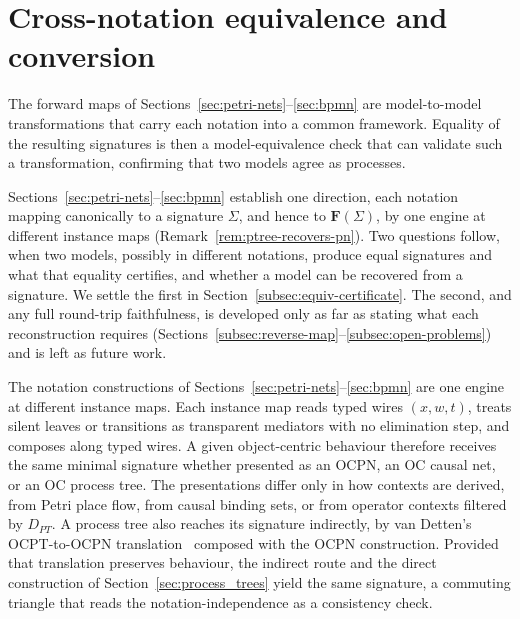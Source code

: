 \section{Cross-notation equivalence and conversion}\label{sec:conversion-framework}

The forward maps of Sections~\ref{sec:petri-nets}--\ref{sec:bpmn} are model-to-model
transformations that carry each notation into a common framework. Equality of the
resulting signatures is then a model-equivalence check that can validate such a
transformation, confirming that two models agree as processes.

Sections~\ref{sec:petri-nets}--\ref{sec:bpmn} establish one direction, each notation mapping
canonically to a signature $\Sigma$, and hence to $\mathbf{F}(\Sigma)$, by one engine at different instance maps
(Remark~\ref{rem:ptree-recovers-pn}). Two questions follow, when two models, possibly in
different notations, produce equal signatures and what that equality certifies, and whether a
model can be recovered from a signature. We settle the first in
Section~\ref{subsec:equiv-certificate}. The second, and any full round-trip faithfulness, is
developed only as far as stating what each reconstruction requires
(Sections~\ref{subsec:reverse-map}--\ref{subsec:open-problems}) and is left as future work.

\begin{remark}
  \label{rem:ptree-recovers-pn}
  The notation constructions of Sections~\ref{sec:petri-nets}--\ref{sec:bpmn} are one engine at
  different instance maps. Each instance map reads typed wires $(x,w,t)$, treats silent leaves or
  transitions as transparent mediators with no elimination step, and composes along typed wires. A
  given object-centric behaviour therefore receives the same minimal signature whether presented as
  an OCPN, an OC causal net, or an OC process tree. The presentations differ only in how contexts
  are derived, from Petri place flow, from causal binding sets, or from operator contexts filtered
  by $D_{PT}$. A process tree also reaches its signature indirectly, by van Detten's OCPT-to-OCPN
  translation~\cite{vandettenDiscoveringCompactLive2024} composed with the OCPN construction.
  Provided that translation preserves behaviour, the indirect route and the direct construction of
  Section~\ref{sec:process_trees} yield the same signature, a commuting triangle that reads the
  notation-independence as a consistency check.
\end{remark}

